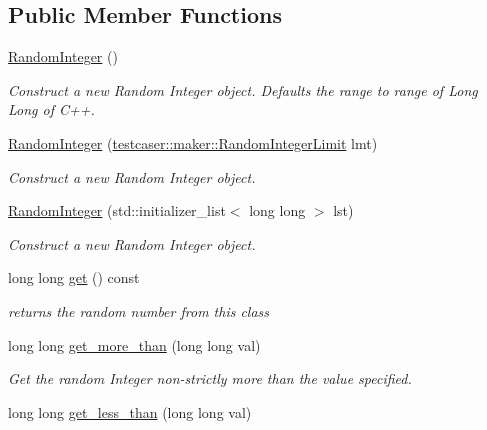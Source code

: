 \subsection*{Public Member Functions}
\begin{DoxyCompactItemize}
\item 
\mbox{\hyperlink{classtestcaser_1_1maker_1_1types_1_1RandomInteger_aee8b13d2d5bad5355924313b56d321c4}{Random\+Integer}} ()
\begin{DoxyCompactList}\small\item\em Construct a new Random Integer object. Defaults the range to range of Long Long of C++. \end{DoxyCompactList}\item 
\mbox{\hyperlink{classtestcaser_1_1maker_1_1types_1_1RandomInteger_a026bc0b7613813494afce8066fb997ea}{Random\+Integer}} (\mbox{\hyperlink{classtestcaser_1_1maker_1_1RandomIntegerLimit}{testcaser\+::maker\+::\+Random\+Integer\+Limit}} lmt)
\begin{DoxyCompactList}\small\item\em Construct a new Random Integer object. \end{DoxyCompactList}\item 
\mbox{\hyperlink{classtestcaser_1_1maker_1_1types_1_1RandomInteger_ae126be1bc8d04520b063924e57ccedc6}{Random\+Integer}} (std\+::initializer\+\_\+list$<$ long long $>$ lst)
\begin{DoxyCompactList}\small\item\em Construct a new Random Integer object. \end{DoxyCompactList}\item 
long long \mbox{\hyperlink{classtestcaser_1_1maker_1_1types_1_1RandomInteger_a3b7754ca1c579f58b959ca6adb483a51}{get}} () const
\begin{DoxyCompactList}\small\item\em returns the random number from this class \end{DoxyCompactList}\item 
long long \mbox{\hyperlink{classtestcaser_1_1maker_1_1types_1_1RandomInteger_ace51a32acc0f219b70aa00d1cd2604c5}{get\+\_\+more\+\_\+than}} (long long val)
\begin{DoxyCompactList}\small\item\em Get the random Integer non-\/strictly more than the value specified. \end{DoxyCompactList}\item 
long long \mbox{\hyperlink{classtestcaser_1_1maker_1_1types_1_1RandomInteger_afe7ef6baf52d095f5b17ad4f8d9e5f1a}{get\+\_\+less\+\_\+than}} (long long val)

\end{DoxyCompactItemize}
